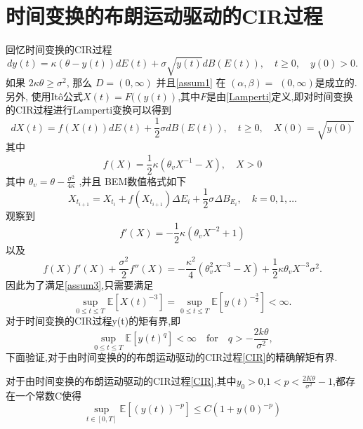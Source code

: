 \section{时间变换的布朗运动驱动的CIR过程}\label{TCCIR}
回忆时间变换的CIR过程
\begin{equation}\label{CIR}
	dy(t)=\kappa(\theta-y(t))dE(t)+\sigma\sqrt{y(t)}dB(E(t)),\quad t\geq0,\quad y(0)>0.
\end{equation}
如果 $2\kappa\theta\geq\sigma^{2}$, 那么 $D=(0,\infty)$ 并且\cref{assum1} 在 $(\alpha,\beta)=$
$(0,\infty)$是成立的. 
另外, 使用It\^{o}公式$X(t)=F((y(t))$,其中$F$是由\cref{Lamperti}定义,即对时间变换的CIR过程进行Lamperti变换可以得到
\begin{equation}
	dX(t)=f(X(t))dE(t)+\frac12\sigma dB(E(t)),\quad t\geq0,\quad X(0)=\sqrt{y(0)}
\end{equation}
其中
\begin{equation}
	f(X)=\dfrac{1}{2}\kappa\left(\theta_vX^{-1}-X\right),\quad X>0
\end{equation}
其中 $\theta_v=\theta-\frac{\sigma^2}{4\kappa}$ ,并且 BEM数值格式如下
\begin{equation}
	X_{t_{i+1}}=X_{t_{i}}+f(X_{t_{i+1}})\Delta E_i+\frac{1}{2}\sigma\Delta B_{E_i},\quad k=0,1,\dots 
\end{equation}
观察到
\begin{equation}
	f'(X)=-\frac{1}{2}\kappa(\theta_vX^{-2}+1)
\end{equation}
以及
\begin{equation}
	f(X)f'(X)+\frac{\sigma^2}{2}f''(X)=-\frac{\kappa^2}{4}(\theta_v^2X^{-3}-X)+\frac{1}{2}\kappa\theta_vX^{-3}\sigma^2.
\end{equation}
因此为了满足\cref{assum3},只需要满足
\begin{equation}
	\sup_{0\leq t\leq T}\mathbb{E}[X(t)^{-3}]=\sup_{0\leq t\leq T}\mathbb{E}[y(t)^{-\frac{3}{2}}] < \infty.
\end{equation}
对于时间变换的CIR过程y(t)的矩有界,即
\begin{equation}
	\sup\limits_{0\leq t\leq T}\mathbb{E}[y(t)^q]<\infty\quad\mathrm{for}\quad q>-\frac{2k\theta}{\sigma^2},
\end{equation}
下面验证,对于由时间变换的的布朗运动驱动的CIR过程\cref{CIR}的精确解矩有界.
\begin{proposition}
	对于由时间变换的布朗运动驱动的CIR过程\cref{CIR},其中$y_0>0$,$1<p<\frac{2K\theta}{\sigma^2}-1$,都存在一个常数C使得
	\begin{equation*}
		\sup\limits_{t\in[0,T]}\mathbb{E}\left[\left(y(t)\right)^{-p}\right]\leq C(1+y(0)^{-p})
	\end{equation*}
\end{proposition}

